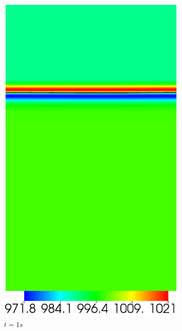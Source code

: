 \begin{figure}[H]
	\centering
	\begin{subfigure}[ht!]{0.2\textwidth}
		\centering
		\includegraphics[width=1\textwidth]{figure/PT_RT/masse_vol/visit0014.png}
		\caption{$t=1s$}
	\end{subfigure}
	\begin{subfigure}[ht!]{0.2\textwidth}
		\centering

\end{subfigure}
\end{figure}
